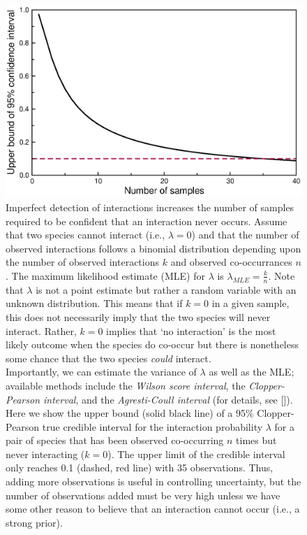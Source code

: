\documentclass[12pt]{article}
\begin{document}
  \begin{figure}[h!]
    \caption{Imperfect detection of interactions increases the number of samples required to be confident that an interaction never occurs. Assume that two species cannot interact (i.e., $\lambda=0$) and that the number of observed interactions follows a binomial distribution depending upon the number of observed interactions $k$ and observed co-occurrances $n$. The maximum likelihood estimate (MLE) for $\lambda$ is $\lambda_{MLE}=\frac{k}{n}$. Note that $\lambda$ is not a point estimate but rather a random variable with an unknown distribution. This means that if $k = 0$ in a given sample, this does not necessarily imply that the two species will never interact. Rather, $k = 0$ implies that `no interaction' is the most likely outcome when the species do co-occur but there is nonetheless some chance that the two species \emph{could} interact.\\
    Importantly, we can estimate the variance of $\lambda$ as well as the MLE; available methods include the \emph{Wilson score interval}, the \emph{Clopper-Pearson interval}, and the \emph{Agresti-Coull interval} (for details, see [\citealp{Brown2001}]).
    Here we show the upper bound (solid black line) of a 95\% Clopper-Pearson true credible interval for the interaction probability $\lambda$ for a pair of species that has been observed co-occurring $n$ times but never interacting ($k = 0$). The upper limit of the credible interval only reaches 0.1 (dashed, red line) with 35 observations. Thus, adding more observations is useful in controlling uncertainty, but the number of observations added must be very high unless we have some other reason to believe that an interaction cannot occur (i.e., a strong prior).}
    \label{upper_limits}
    \begin{center}
    \includegraphics*[width=.8\textwidth]{figures/upper_limit_DG.eps}
    \end{center}
    \end{figure}
\end{document}
